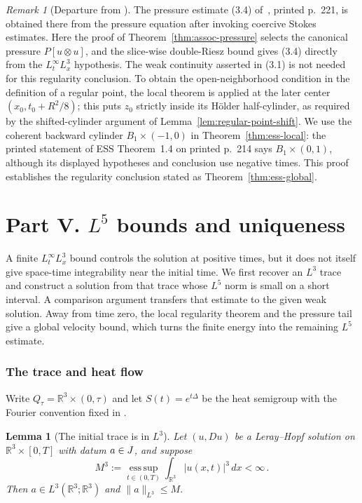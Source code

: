 \documentclass[11pt,letterpaper]{article}
\numberwithin{equation}{section}
\theoremstyle{plain}
\newtheorem{lemma}[theorem]{Lemma}
\theoremstyle{definition}
\theoremstyle{remark}
\newtheorem{remark}[theorem]{Remark}
\begin{document}
\begin{remark}[Departure from \cite{ESS2003}]
The pressure estimate (3.4) of~\cite{ESS2003}, printed p.~221, is obtained
there from the pressure equation after invoking coercive Stokes estimates.
Here the proof of Theorem~\ref{thm:assoc-pressure} selects the canonical
pressure $P[u\otimes u]$, and the slice-wise double-Riesz bound gives (3.4)
directly from the $L^\infty_tL^3_x$ hypothesis. The weak continuity asserted
in (3.1) is not needed for this regularity conclusion. To obtain the
open-neighborhood condition in the definition of a regular point, the local theorem is
applied at the later center $(x_0,t_0+R^2/8)$; this puts $z_0$ strictly inside
its Hölder half-cylinder, as required by the shifted-cylinder argument of
Lemma~\ref{lem:regular-point-shift}. We use the coherent backward cylinder
$B_1\times(-1,0)$ in Theorem~\ref{thm:ess-local}: the printed statement of
ESS Theorem~1.4 on printed p.~214 says $B_1\times(0,1)$, although its displayed
hypotheses and conclusion use negative times. This proof establishes the
regularity conclusion stated as Theorem~\ref{thm:ess-global}.
\end{remark}

\part*{Part V. $L^5$ bounds and uniqueness}

A finite $L^\infty_tL^3_x$ bound controls the solution at positive times, but it does not itself give space-time integrability near the initial time. We first recover an $L^3$ trace and construct a solution from that trace whose $L^5$ norm is small on a short interval. A comparison argument transfers that estimate to the given weak solution. Away from time zero, the local regularity theorem and the pressure tail give a global velocity bound, which turns the finite energy into the remaining $L^5$ estimate.

\section{The trace and heat flow}\label{sec:pv-trace}

Write $Q_\tau=\mathbb R^3\times(0,\tau)$ and let $S(t)=e^{t\Delta}$ be the heat semigroup with the Fourier convention fixed in \cite[Section~9]{CKNLean}.

\begin{lemma}[The initial trace is in $L^3$]\label{lem:pv-initial-l3}
Let $(u,Du)$ be a Leray--Hopf solution on $\mathbb R^3\times[0,T]$ with datum $a\in J$, and suppose
\begin{equation*}
M^3:=\operatorname*{ess\,sup}_{t\in(0,T)}\int_{\mathbb R^3}|u(x,t)|^3\,dx<\infty\,.
\end{equation*}
Then $a\in L^3(\mathbb R^3;\mathbb R^3)$ and $\|a\|_{L^3}\le M$.
\end{lemma}
\end{document}

